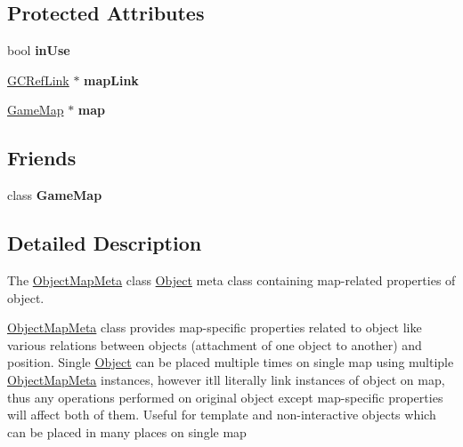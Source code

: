 \subsection*{Protected Attributes}
\begin{DoxyCompactItemize}
\item 
\hypertarget{classObjectMapMeta_a4dd5cbfe0d5de2020a432f3deb94bbb2}{}bool {\bfseries in\+Use}\label{classObjectMapMeta_a4dd5cbfe0d5de2020a432f3deb94bbb2}

\item 
\hypertarget{classObjectMapMeta_a97d9c262d487cce070f22f035f1c1e16}{}\hyperlink{classGCRefLink}{G\+C\+Ref\+Link} $\ast$ {\bfseries map\+Link}\label{classObjectMapMeta_a97d9c262d487cce070f22f035f1c1e16}

\item 
\hypertarget{classObjectMapMeta_aec01f78a915fd54a8cf7ba59de3d3dcf}{}\hyperlink{classGameMap}{Game\+Map} $\ast$ {\bfseries map}\label{classObjectMapMeta_aec01f78a915fd54a8cf7ba59de3d3dcf}

\end{DoxyCompactItemize}
\subsection*{Friends}
\begin{DoxyCompactItemize}
\item 
\hypertarget{classObjectMapMeta_a93630ea74a3218a3e2e96b7bf2c07c66}{}class {\bfseries Game\+Map}\label{classObjectMapMeta_a93630ea74a3218a3e2e96b7bf2c07c66}

\end{DoxyCompactItemize}


\subsection{Detailed Description}
The \hyperlink{classObjectMapMeta}{Object\+Map\+Meta} class \hyperlink{classObject}{Object} meta class containing map-\/related properties of object. 

\hyperlink{classObjectMapMeta}{Object\+Map\+Meta} class provides map-\/specific properties related to object like various relations between objects (attachment of one object to another) and position. Single \hyperlink{classObject}{Object} can be placed multiple times on single map using multiple \hyperlink{classObjectMapMeta}{Object\+Map\+Meta} instances, however it\textquotesingle{}ll literally link instances of object on map, thus any operations performed on original object except map-\/specific properties will affect both of them. Useful for template and non-\/interactive objects which can be placed in many places on single map

